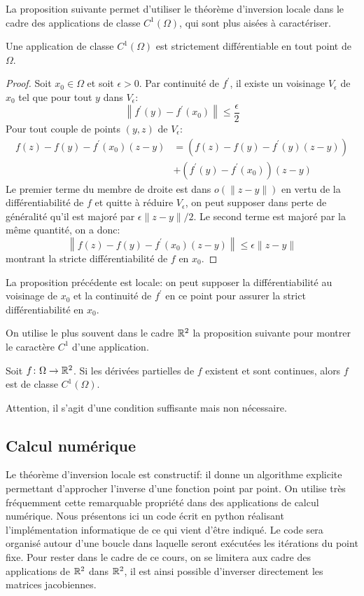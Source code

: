 La proposition suivante permet d'utiliser le théorème d'inversion locale dans le cadre des applications de classe $C^1(\Omega)$, qui sont plus aisées à caractériser.
\begin{fprop}
Une application de classe $C^1(\Omega)$ est strictement différentiable en tout point de $\Omega$.
\end{fprop}
\begin{proof}
Soit $x_0\in \Omega$ et soit $\epsilon > 0$. Par continuité de $f^\prime$, il existe un voisinage $V_\epsilon$ de 
$x_0$ tel que pour tout $y$ dans $V_\epsilon$:
\[
\left\| f^{\prime}(y)-f^\prime(x_0) \right\| \leq \frac{\epsilon}{2} 
\]
Pour tout couple de points $(y,z)$ de $V_\epsilon$:
\begin{align*}
f(z)-f(y)-f^\prime(x_0)(z-y) & = \left(f(z)-f(y)-f^\prime(y)(z-y) \right)  \\
 & + \left(f^\prime(y)-f^\prime(x_0)\right)(z-y)
\end{align*}
Le premier terme du membre de droite est dans $o(\|z-y\|)$ en vertu de la différentiabilité de $f$ et quitte à réduire $V_\epsilon$, on peut supposer dans perte de généralité qu'il est majoré par $\epsilon \|z-y\| /2$. Le second terme est majoré par la même quantité, on a donc:
\[
\left\|f(z)-f(y)-f^\prime(x_0)(z-y)\right \| \leq  \epsilon \|z-y\|
\]
montrant la stricte différentiabilité de $f$ en $x_0$.
\end{proof}
La proposition précédente est locale: on peut supposer la différentiabilité au voisinage de $x_0$ et la continuité de $f^\prime$ en ce point pour assurer la strict différentiabilité en $x_0$.

On utilise le plus souvent dans le cadre $\mathbb{R}^2$ la proposition suivante pour montrer le caractère $C^1$ d'une application. 

\begin{fprop}
Soit $f \colon \Omega \to \mathbb{R}^2$. Si les dérivées partielles de $f$ existent et sont continues, alors $f$ est de classe $C^1(\Omega)$.
\end{fprop}
\begin{danger}
\begin{rem}
Attention, il s'agit d'une condition suffisante mais non nécessaire.
\end{rem}
\end{danger}

\subsection{Calcul numérique}
Le théorème d'inversion locale est constructif: il donne un algorithme explicite permettant d'approcher l'inverse d'une fonction point par point. On utilise très fréquemment cette remarquable propriété dans des applications de calcul numérique.
Nous présentons ici un code écrit en python réalisant l'implémentation informatique de ce qui vient d'être indiqué. Le code sera organisé autour d'une boucle dans laquelle seront exécutées les itérations du point fixe. Pour rester dans le cadre de ce cours, on se limitera aux cadre des applications de $\mathbb{R}^2$ dans $\mathbb{R}^2$, il est ainsi possible d'inverser directement les matrices jacobiennes. 

